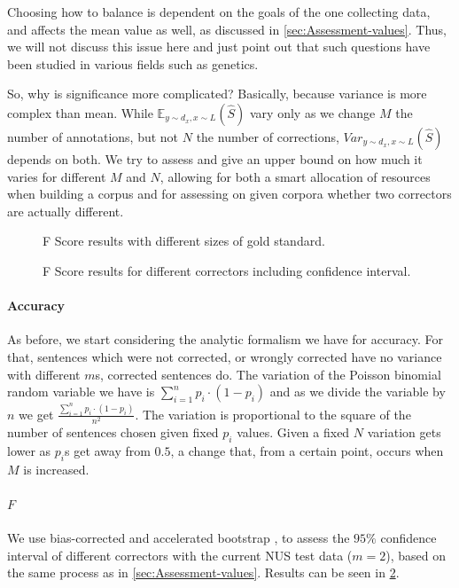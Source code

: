 \documentclass[english]{article}
\begin{document}
Choosing how to balance is dependent on the goals of the one collecting data, and affects the mean value as well, as discussed in \ref{sec:Assessment-values}. Thus, we will not discuss this issue here and just point out that such questions have been studied in various fields such as genetics\cite{ionita2010optimal}.

So, why is significance more complicated? Basically, because variance is more complex than mean. While $\mathbb{E}_{y\sim d_x, x\sim L}\left(\hat{S}\right)$ vary only as we change $M$
the number of annotations, but not $N$ the number of corrections,
$Var_{y\sim d_x, x\sim L}(\hat{S})$ depends on both. We try to assess and give an upper
bound on how much it varies for different $M$ and $N$, allowing
for both a smart allocation of resources when building a corpus and for assessing on given corpora whether two correctors are actually different.

\begin{figure}
	\caption{F Score results with different sizes of gold standard.}
	\label{tab:F_Ms}
\end{figure}
\begin{figure}
	\caption{F Score results for different correctors including confidence interval.}
	\label{fig:F_correctors}
\end{figure}


\paragraph{Accuracy}As before, we start considering the analytic formalism we have for accuracy. For that, sentences which were not corrected, or wrongly corrected have no variance with different $m$s, corrected sentences do. The variation of the Poisson binomial random variable we have is $\sum_{i=1}^{n}p_i\cdot\left(1-p_i\right)$ and as we divide the variable by $n$ we get $\frac{\sum_{i=1}^{n}p_i\cdot\left(1-p_i\right)}{n^2}$. 
The variation is proportional to the square of the number of sentences chosen given fixed $p_i$ values. Given a fixed $N$ variation gets lower as $p_i$s get away from $0.5$, a change that, from a certain point, occurs when $M$ is increased.

\paragraph{$F$}We use bias-corrected and accelerated bootstrap \cite{efron1987better}, to assess the $95\%$ confidence interval of different correctors with the current NUS test data ($m=2$), based on the same process as in \ref{sec:Assessment-values}. Results can be seen in \ref{fig:F_correctors}.
\end{document}
